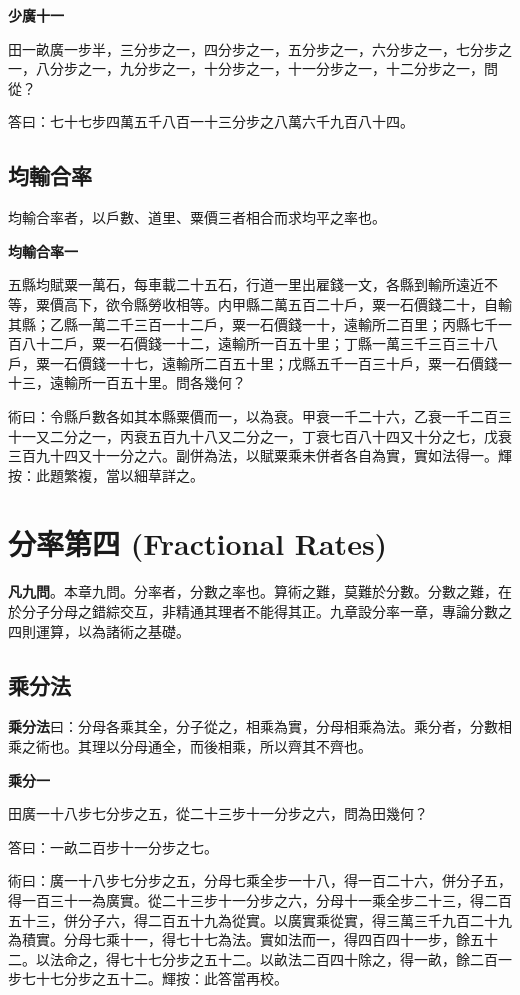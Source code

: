 \documentclass[11pt,a4paper]{article}
\newenvironment{problemenv}[1]{%
  \medskip\noindent\textbf{#1}\par\nopagebreak\smallskip
}{\medskip}
\begin{document}
\begin{problemenv}{少廣十一}
田一畝廣一步半，三分步之一，四分步之一，五分步之一，六分步之一，七分步之一，八分步之一，九分步之一，十分步之一，十一分步之一，十二分步之一，問從？

\textsf{答曰：}七十七步四萬五千八百一十三分步之八萬六千九百八十四。
\end{problemenv}

\subsection{均輸合率}

均輸合率者，以戶數、道里、粟價三者相合而求均平之率也。

\begin{problemenv}{均輸合率一}
五縣均賦粟一萬石，每車載二十五石，行道一里出雇錢一文，各縣到輸所遠近不等，粟價高下，欲令縣勞收相等。内甲縣二萬五百二十戶，粟一石價錢二十，自輸其縣；乙縣一萬二千三百一十二戶，粟一石價錢一十，遠輸所二百里；丙縣七千一百八十二戶，粟一石價錢一十二，遠輸所一百五十里；丁縣一萬三千三百三十八戶，粟一石價錢一十七，遠輸所二百五十里；戊縣五千一百三十戶，粟一石價錢一十三，遠輸所一百五十里。問各幾何？

\textsf{術曰：}令縣戶數各如其本縣粟價而一，以為衰。甲衰一千二十六，乙衰一千二百三十一又二分之一，丙衰五百九十八又二分之一，丁衰七百八十四又十分之七，戊衰三百九十四又十一分之六。副併為法，以賦粟乘未併者各自為實，實如法得一。輝按：此題繁複，當以細草詳之。
\end{problemenv}

\newpage
\section{分率第四 (Fractional Rates)}

\textbf{凡九問}。本章九問。分率者，分數之率也。算術之難，莫難於分數。分數之難，在於分子分母之錯綜交互，非精通其理者不能得其正。九章設分率一章，專論分數之四則運算，以為諸術之基礎。

\subsection{乘分法}

\textbf{乘分法}曰：分母各乘其全，分子從之，相乘為實，分母相乘為法。乘分者，分數相乘之術也。其理以分母通全，而後相乘，所以齊其不齊也。

\begin{problemenv}{乘分一}
田廣一十八步七分步之五，從二十三步十一分步之六，問為田幾何？

\textsf{答曰：}一畝二百步十一分步之七。

\textsf{術曰：}廣一十八步七分步之五，分母七乘全步一十八，得一百二十六，併分子五，得一百三十一為廣實。從二十三步十一分步之六，分母十一乘全步二十三，得二百五十三，併分子六，得二百五十九為從實。以廣實乘從實，得三萬三千九百二十九為積實。分母七乘十一，得七十七為法。實如法而一，得四百四十一步，餘五十二。以法命之，得七十七分步之五十二。以畝法二百四十除之，得一畝，餘二百一步七十七分步之五十二。輝按：此答當再校。
\end{problemenv}
\end{document}
